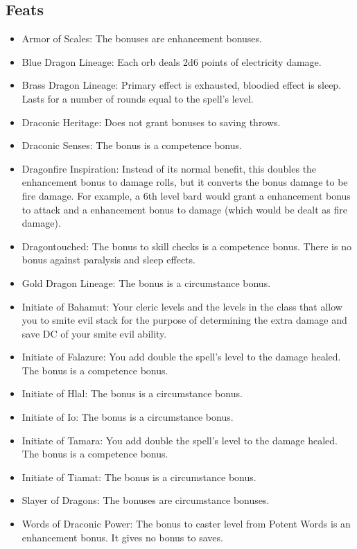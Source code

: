 \subsection{Feats}
\begin{itemize}
\item Armor of Scales: The bonuses are enhancement bonuses.
\item Blue Dragon Lineage: Each orb deals 2d6 points of electricity damage.
\item Brass Dragon Lineage: Primary effect is exhausted, bloodied effect is sleep. Lasts for a number of rounds equal to the spell's level.
\item Draconic Heritage: Does not grant bonuses to saving throws.
\item Draconic Senses: The bonus is a competence bonus.
\item Dragonfire Inspiration: Instead of its normal benefit, this doubles the enhancement bonus to damage rolls, but it converts the bonus damage to be fire damage. For example, a 6th level bard would grant a  enhancement bonus to attack and a  enhancement bonus to damage (which would be dealt as fire damage). 
\item Dragontouched: The bonus to skill checks is a competence bonus. There is no bonus against paralysis and sleep effects.
\item Gold Dragon Lineage: The bonus is a circumstance bonus.
\item Initiate of Bahamut: Your cleric levels and the levels in the class that allow you to smite evil stack for the purpose of determining the extra damage and save DC of your smite evil ability.
\item Initiate of Falazure: You add double the spell's level to the damage healed. The bonus is a competence bonus.
\item Initiate of Hlal: The bonus is a circumstance bonus.
\item Initiate of Io: The bonus is a circumstance bonus.
\item Initiate of Tamara: You add double the spell's level to the damage healed. The bonus is a competence bonus.
\item Initiate of Tiamat: The bonus is a circumstance bonus.
\item Slayer of Dragons: The bonuses are circumstance bonuses.
\item Words of Draconic Power: The bonus to caster level from Potent Words is an enhancement bonus. It gives no bonus to saves.
\end{itemize}


